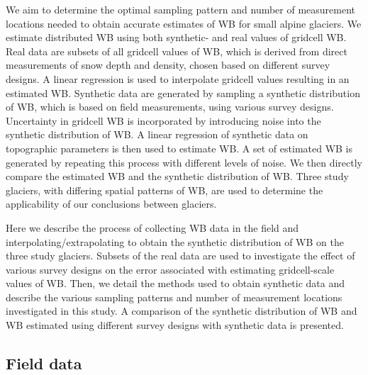 \documentclass{article}
\begin{document}
We aim to determine the optimal sampling pattern and number of measurement locations needed to obtain accurate estimates of WB for small alpine glaciers. We estimate distributed WB using both synthetic- and real values of gridcell WB. Real data are subsets of all gridcell values of WB, which is derived from direct measurements of snow depth and density, chosen based on different survey designs. A linear regression is used to interpolate gridcell values resulting in an estimated WB. Synthetic data are generated by sampling a synthetic distribution of WB, which is based on field measurements, using various survey designs. Uncertainty in gridcell WB is incorporated by introducing noise into the synthetic distribution of WB. A linear regression of synthetic data on topographic parameters is then used to estimate WB. A set of estimated WB is generated by repeating this process with different levels of noise. We then directly compare the estimated WB and the synthetic distribution of WB. Three study glaciers, with differing spatial patterns of WB, are used to determine the applicability of our conclusions between glaciers. 

Here we describe the process of collecting WB data in the field and interpolating/extrapolating to obtain the synthetic distribution of WB on the three study glaciers. Subsets of the real data are used to investigate the effect of various survey designs on the error associated with estimating gridcell-scale values of WB. Then, we detail the methods used to obtain synthetic data and describe the various sampling patterns and number of measurement locations investigated in this study. A comparison of the synthetic distribution of WB and WB estimated using different survey designs with synthetic data is presented. 

\subsection{Field data}
\end{document}
